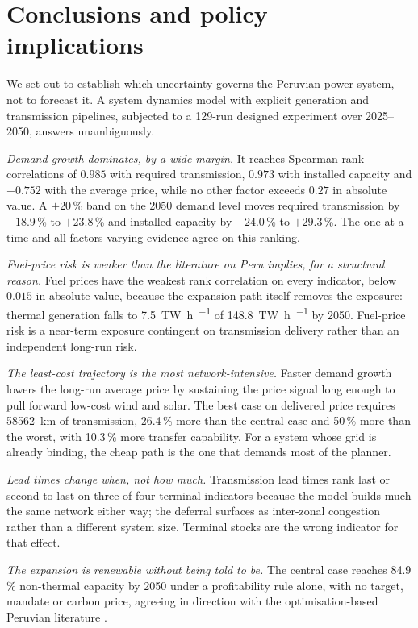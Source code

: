 \section{Conclusions and policy implications}
\label{sec:conclusions}

We set out to establish which uncertainty governs the Peruvian power system, not to
forecast it. A system dynamics model with explicit generation and transmission
pipelines, subjected to a 129-run designed experiment over 2025--2050, answers
unambiguously.

\emph{Demand growth dominates, by a wide margin.} It reaches Spearman rank
correlations of $0.985$ with required transmission, $0.973$ with installed capacity
and $-0.752$ with the average price, while no other factor exceeds $0.27$ in absolute
value. A $\pm$20\,\% band on the 2050 demand level moves required transmission by
$-18.9$\,\% to $+23.8$\,\% and installed capacity by $-24.0$\,\% to $+29.3$\,\%. The
one-at-a-time and all-factors-varying evidence agree on this ranking.

\emph{Fuel-price risk is weaker than the literature on Peru implies, for a structural
reason.} Fuel prices have the weakest rank correlation on every indicator, below $0.015$ in
absolute value, because the expansion path
itself removes the exposure: thermal generation falls to
\SI{7.5}{\tera\watt\hour\per\year} of \SI{148.8}{\tera\watt\hour\per\year} by 2050.
Fuel-price risk is a near-term exposure contingent on transmission delivery rather
than an independent long-run risk.

\emph{The least-cost trajectory is the most network-intensive.} Faster demand growth
lowers the long-run average price by sustaining the price signal long enough to pull
forward low-cost wind and solar. The best case on delivered price requires
\SI{58562}{\kilo\meter} of transmission, 26.4\,\% more than the central case and
50\,\% more than the worst, with 10.3\,\% more transfer capability. For a system whose
grid is already binding, the cheap path is the one that demands most of the planner.

\emph{Lead times change when, not how much.} Transmission lead times rank last or
second-to-last on three of four terminal indicators because the model builds much the same network
either way; the deferral surfaces as inter-zonal congestion rather than a different
system size. Terminal stocks are the wrong indicator for that effect.

\emph{The expansion is renewable without being told to be.} The central case reaches
84.9\,\% non-thermal capacity by 2050 under a profitability rule alone, with no target,
mandate or carbon price, agreeing in direction with the optimisation-based Peruvian
literature \citep{fiestas2024,delacruz2024}.

